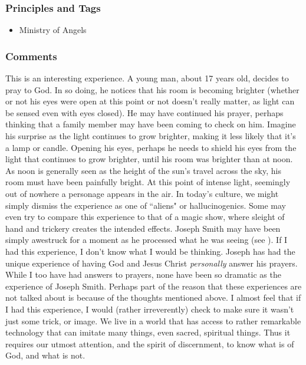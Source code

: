\documentclass[12pt]{report}
\begin{document}
\subsubsection{Principles and Tags\label{js:principles3}}
\begin{itemize}
\item {}Ministry of Angels
\end{itemize}

\subsubsection{Comments\label{js:comments3}}
This is an interesting experience.  A young man, about 17 years old, decides to pray to God.  In so doing, he notices that his room is becoming brighter (whether or not his eyes were open at this point or not doesn't really matter, as light can be sensed even with eyes closed).  He may have continued his prayer, perhaps thinking that a family member may have been coming to check on him.  Imagine his surprise as the light continues to grow brighter, making it less likely that it's a lamp or candle.  Opening his eyes, perhaps he needs to shield his eyes from the light that continues to grow brighter, until his room was brighter than at noon.  As noon is generally seen as the height of the sun's travel across the sky, his room must have been painfully bright.  At this point of intense light, seemingly out of nowhere a personage appears in the air.  In today's culture, we might simply dismiss the experience as one of ``aliens" or hallucinogenics.  Some may even try to compare this experience to that of a magic show, where sleight of hand and trickery creates the intended effects. Joseph Smith may have been simply awestruck for a moment as he processed what he was seeing (see ). If I had this experience, I don't know what I would  be thinking.  Joseph has had the unique experience of having God and Jesus Christ \emph{personally} answer his prayers.  While I too have had answers to prayers, none have been so dramatic as the experience of Joseph Smith.  Perhaps part of the reason that these experiences are not talked about is because of the thoughts mentioned above.  I almost feel that if I had this experience, I would (rather irreverently) check to make sure it wasn't just some trick, or image.  We live in a world that has access to rather remarkable technology that can imitate many things, even sacred, spiritual things.  Thus it requires our utmost attention, and the spirit of discernment, to know what is of God, and what is not.
\end{document}
